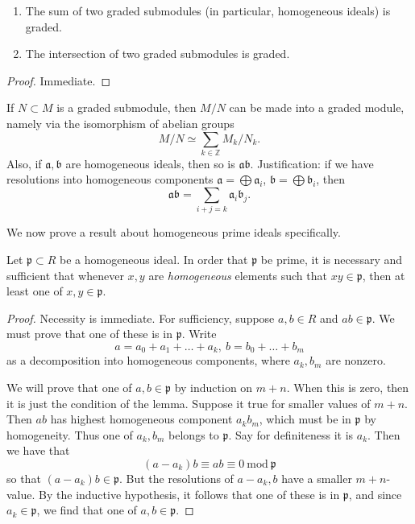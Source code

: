 \begin{lemma} 
\begin{enumerate}
\item  The sum of two graded submodules (in particular, homogeneous ideals) is graded.
\item  The intersection of two graded submodules is graded.
\end{enumerate}
\end{lemma} 
\begin{proof} 
Immediate.
\end{proof} 

If $N \subset M$ is a graded submodule, then $M/N$ can be made into a graded
module, namely via the isomorphism of abelian groups
\[  M/N \simeq \sum_{k \in \mathbb{Z}} M_k/N_k.  \]
Also, if $\mathfrak{a}, \mathfrak{b}$ are homogeneous ideals, then so is
$\mathfrak{ab}$.  Justification: if we have resolutions into homogeneous
components $\mathfrak{a} = \bigoplus \mathfrak{a}_i$, $\mathfrak{b} = \bigoplus
\mathfrak{b}_i$, then 
\[  \mathfrak{ab} = \sum_{i+j=k} \mathfrak{a}_i \mathfrak{b}_j . \]



We now prove a result about homogeneous prime ideals specifically.
\begin{lemma} \label{homogeneousprimeideal}
Let $\mathfrak{p} \subset R$ be a homogeneous ideal. In order that $\mathfrak{p}$ be prime, it is
necessary and sufficient that whenever $x,y$ are \emph{homogeneous} elements
such that $xy \in \mathfrak{p}$, then at least one of $x,y \in \mathfrak{p}$.
\end{lemma} 
\begin{proof} 
Necessity is immediate. For sufficiency, suppose $a,b  \in R$ and $ab \in
\mathfrak{p}$. We must prove that one of these is in $\mathfrak{p}$. Write 
\[  a = a_0 + a_1  + \dots + a_k,  \ b = b_0 + \dots + b_m  \]
as a decomposition into homogeneous components, where $a_k, b_m$ are nonzero.

We will prove that one of $a,b \in \mathfrak{p}$ by induction on $m+n$. When this is
zero, then it is just the condition of the lemma.
Suppose it true for smaller values of $m+n$.
Then $ab$ has highest homogeneous component $a_k b_m$, which must be in $\mathfrak{p}$
by homogeneity.  Thus one of $a_k, b_m$ belongs to $\mathfrak{p}$. Say for
definiteness it is $a_k$. Then we have that
\[  (a-a_k)b \equiv ab \equiv 0 \  \mathrm{mod} \  \mathfrak{p}  \]
so that $(a-a_k)b \in \mathfrak{p}$. But the resolutions of $a-a_k, b$ have a smaller
$m+n$-value. By the inductive hypothesis, it follows that one of these is in
$\mathfrak{p}$, and since $a_k \in \mathfrak{p}$, we find that one of $a,b \in \mathfrak{p}$.  
\end{proof} 


